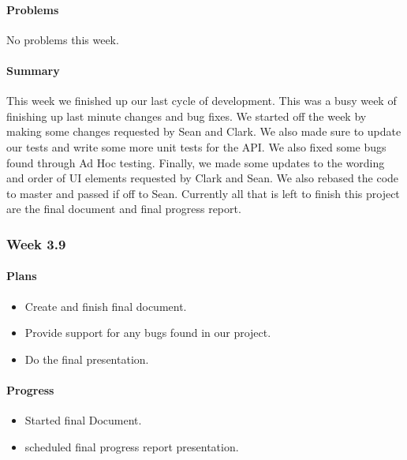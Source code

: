 \documentclass[onecolumn, draftclsnofoot,10pt, compsoc]{article}
\begin{document}
		    \paragraph{Problems} \hfill \break
		        No problems this week.\\
		    \paragraph{Summary} \hfill \break
            This week we finished up our last cycle of development. This was a busy week of finishing up last minute changes and bug fixes. We started off the week by making some changes requested by Sean and Clark. We also made sure to update our tests and write some more unit tests for the API. We also fixed some bugs found through Ad Hoc testing. Finally, we made some updates to the wording and order of UI elements requested by Clark and Sean. We also rebased the code to master and passed if off to Sean. Currently all that is left to finish this project are the final document and final progress report.\\
		\subsubsection{Week 3.9}
		    \paragraph{Plans} \hfill \break
		        \begin{itemize}
		            \item Create and finish final document.\\
		            \item Provide support for any bugs found in our project.\\
		            \item Do the final presentation.\\
		        \end{itemize}
		    \paragraph{Progress} \hfill \break
		        \begin{itemize}
		            \item Started final Document.\\
		            \item scheduled final progress report presentation.\\
		        \end{itemize}
\end{document}
